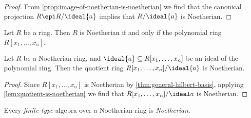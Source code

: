 \begin{proof}
From \cref{prop:image-of-noetherian-is-noetherian} we find that the canonical
projection \(R \epi R/\ideal{a}\) implies that \(R/\ideal{a}\) is Noetherian.
\end{proof}

\begin{theorem}
\label{thm:general-hilbert-basis}
Let \(R\) be a ring. Then \(R\) is Noetherian if and only if the polynomial ring
\(R[x_1, \dots, x_n]\).
\end{theorem}


\begin{corollary}
\label{cor:noetherian-quotient-poly-ring}
Let \(R\) be a Noetherian ring, and \(\ideal{a} \subseteq R[x_1, \dots, x_n]\)
be an ideal of the polynomial ring. Then the quotient ring
\(R[x_1, \dots, x_n]/\ideal{a}\) is Noetherian.
\end{corollary}

\begin{proof}
Since \(R[x_1, \dots, x_n]\) is Noetherian by \cref{thm:general-hilbert-basis},
applying \cref{lem:quotient-is-noetherian} we find that \(R[x_1, \dots,
x_n]/\ideal a\) is Noetherian.
\end{proof}

\begin{corollary}
\label{cor:finite-type-alg-noetherian}
Every \emph{finite-type} algebra over a Noetherian ring is \emph{Noetherian}.
\end{corollary}



